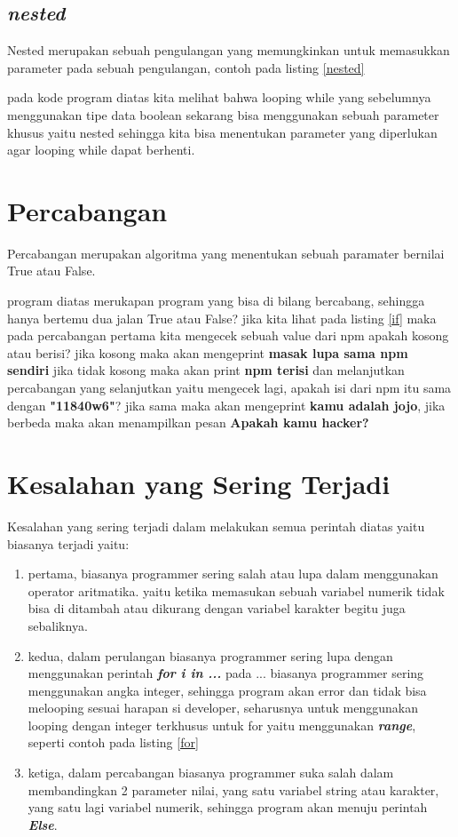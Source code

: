 \subsection{\textit{nested}}
Nested merupakan sebuah pengulangan yang memungkinkan untuk memasukkan parameter pada sebuah pengulangan, contoh pada listing \ref{nested}



pada kode program diatas kita melihat bahwa looping while yang sebelumnya menggunakan tipe data boolean sekarang bisa menggunakan sebuah parameter khusus yaitu nested sehingga kita bisa menentukan parameter yang diperlukan agar looping while dapat berhenti.

\section{Percabangan}
Percabangan merupakan algoritma yang menentukan sebuah paramater bernilai True atau False.



program diatas merukapan program yang bisa di bilang bercabang, sehingga hanya bertemu dua jalan True atau False? jika kita lihat pada listing \ref{if} maka pada percabangan pertama kita mengecek sebuah value dari npm apakah kosong atau berisi? jika kosong maka akan mengeprint \textbf{masak lupa sama npm sendiri} jika tidak kosong maka akan print \textbf{npm terisi} dan melanjutkan percabangan yang selanjutkan yaitu mengecek lagi, apakah isi dari npm itu sama dengan \textbf{"11840w6"}? jika sama maka akan mengeprint \textbf{kamu adalah jojo}, jika berbeda maka akan menampilkan pesan \textbf{Apakah kamu hacker?}

\section{Kesalahan yang Sering Terjadi}
Kesalahan yang sering terjadi dalam melakukan semua perintah diatas yaitu biasanya terjadi yaitu:
\begin{enumerate}
\item pertama, biasanya programmer sering salah atau lupa dalam menggunakan operator aritmatika. yaitu ketika memasukan sebuah variabel numerik tidak bisa di ditambah atau dikurang dengan variabel karakter begitu juga sebaliknya.
\item kedua, dalam perulangan biasanya programmer sering lupa dengan menggunakan perintah \textbf{\textit{for i in ...}} pada ... biasanya programmer sering menggunakan angka integer, sehingga program akan error dan tidak bisa melooping sesuai harapan si developer, seharusnya untuk menggunakan looping dengan integer terkhusus untuk for yaitu menggunakan \textbf{\textit{range}}, seperti contoh pada listing \ref{for}
\item ketiga, dalam percabangan biasanya programmer suka salah dalam membandingkan 2 parameter nilai, yang satu variabel string atau karakter, yang satu lagi variabel numerik, sehingga program akan menuju perintah \textbf{\textit{Else}}.
\end{enumerate}

